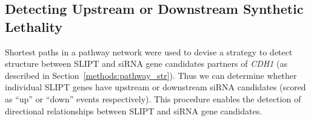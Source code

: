 
\FloatBarrier

\subsection{Detecting Upstream or Downstream Synthetic Lethality}  \label{chapt4:Structure_GPCR}

Shortest paths in a \gls{pathway} network were used to devise a strategy to detect  structure between \gls{SLIPT} and \gls{siRNA} gene candidates partners of \textit{CDH1} (as described in Section~\ref{methods:pathway_str}). Thus we can determine whether individual \gls{SLIPT} genes have upstream or downstream \gls{siRNA} candidates (scored as ``up'' or ``down'' events respectively). This procedure enables the detection of directional relationships between \gls{SLIPT} and \gls{siRNA} gene candidates. %


